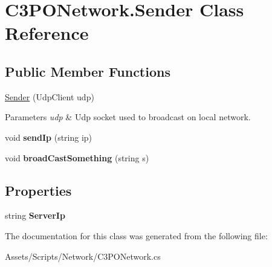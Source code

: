 \hypertarget{class_c3_p_o_network_1_1_sender}{\section{C3\-P\-O\-Network.\-Sender Class Reference}
\label{class_c3_p_o_network_1_1_sender}
}
\subsection*{Public Member Functions}
\begin{DoxyCompactItemize}
\item 
\hypertarget{class_c3_p_o_network_1_1_sender_ac80e64104d4bb32de50bb7a2558debda}{\hyperlink{class_c3_p_o_network_1_1_sender_ac80e64104d4bb32de50bb7a2558debda}{Sender} (Udp\-Client udp)}\label{class_c3_p_o_network_1_1_sender_ac80e64104d4bb32de50bb7a2558debda}

\begin{DoxyCompactList}\small\item\em 
\begin{DoxyParams}{Parameters}
{\em udp} & Udp socket used to broadcast on local network.\\
\hline
\end{DoxyParams}
\end{DoxyCompactList}\item 
\hypertarget{class_c3_p_o_network_1_1_sender_a864e1a27bd972798659ea67cd261180d}{void {\bfseries send\-Ip} (string ip)}\label{class_c3_p_o_network_1_1_sender_a864e1a27bd972798659ea67cd261180d}

\item 
\hypertarget{class_c3_p_o_network_1_1_sender_a44ba928be763907064a9973409e62911}{void {\bfseries broad\-Cast\-Something} (string s)}\label{class_c3_p_o_network_1_1_sender_a44ba928be763907064a9973409e62911}

\end{DoxyCompactItemize}
\subsection*{Properties}
\begin{DoxyCompactItemize}
\item 
\hypertarget{class_c3_p_o_network_1_1_sender_a3ef71e737b239a0e248d4d652182afdf}{string {\bfseries Server\-Ip}}\label{class_c3_p_o_network_1_1_sender_a3ef71e737b239a0e248d4d652182afdf}

\end{DoxyCompactItemize}


The documentation for this class was generated from the following file\-:\begin{DoxyCompactItemize}
\item 
Assets/\-Scripts/\-Network/C3\-P\-O\-Network.\-cs\end{DoxyCompactItemize}
